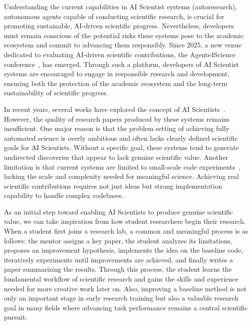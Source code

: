 Understanding the current capabilities in AI Scientist systems  (autoresearch), autonomous agents capable of conducting scientific research, is crucial for promoting sustainable, AI-driven scientific progress.
Nevertheless, developers must remain conscious of the potential risks these systems pose to the academic ecosystem and commit to advancing them responsibly.
Since 2025, a new venue dedicated to evaluating AI-driven scientific contributions, the Agents4Science conference~\citep{agents4science, bianchi2025exploring}, has emerged. 
Through such a platform, developers of AI Scientist systems are encouraged to engage in responsible research and development, ensuring both the protection of the academic ecosystem and the long-term sustainability of scientific progress.

In recent years, several works have explored the concept of AI Scientists~\citep{lu2024ai, weng2024cycleresearcher, yamada2025ai, tang2025ai}. However, the quality of research papers produced by these systems remains insufficient. One major reason is that the problem setting of achieving fully automated science is overly ambitious and often lacks clearly defined scientific goals for AI Scientists. Without a specific goal, these systems tend to generate undirected discoveries that appear to lack genuine scientific value. Another limitation is that current systems are limited to small-scale code experiments~\citep{zhu2025ai, lu2024ai, yamada2025ai}, lacking the scale and complexity needed for meaningful science. Achieving real scientific contributions requires not just ideas but strong implementation capability to handle complex codebases.

As an initial step toward enabling AI Scientists to produce genuine scientific value, we can take inspiration from how student researchers begin their research. When a student first joins a research lab, a common and meaningful process is as follows: the mentor assigns a key paper, the student analyzes its limitations, proposes an improvement hypothesis, implements the idea on the baseline code, iteratively experiments until improvements are achieved, and finally writes a paper summarizing the results. Through this process, the student learns the fundamental workflow of scientific research and gains the skills and experience needed for more creative work later on. Also, improving a baseline method is not only an important stage in early research training but also a valuable research goal in many fields where advancing task performance remains a central scientific pursuit.



